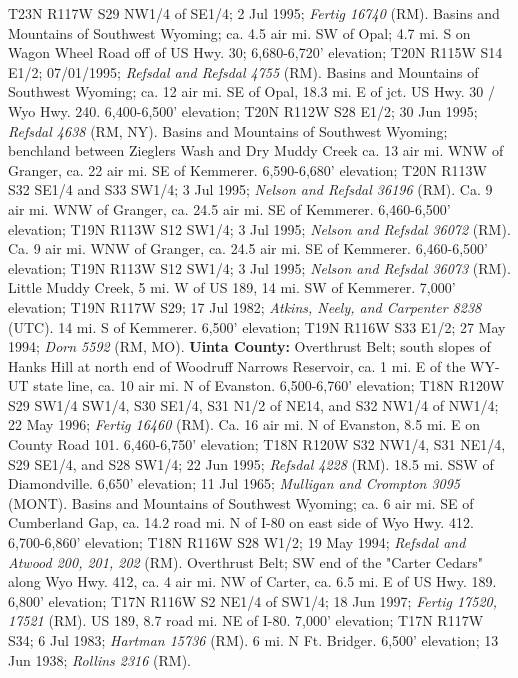 T23N R117W S29 NW1/4 of SE1/4; 2 Jul 1995; \textit{Fertig 16740} (RM).
Basins and Mountains of Southwest Wyoming; ca. 4.5 air mi. SW of Opal; 4.7 mi. S
on Wagon Wheel Road off of US Hwy. 30; 6,680-6,720' elevation;
T20N R115W S14 E1/2; 07/01/1995; \textit{Refsdal and Refsdal 4755} (RM).
Basins and Mountains of Southwest Wyoming; ca. 12 air mi. SE of Opal, 18.3 mi. E
of jct. US Hwy. 30 / Wyo Hwy. 240. 6,400-6,500' elevation; T20N R112W S28 E1/2;
30 Jun 1995; \textit{Refsdal 4638} (RM, NY).
Basins and Mountains of Southwest Wyoming; benchland between Zieglers Wash and
Dry Muddy Creek ca. 13 air mi. WNW of Granger, ca. 22 air mi. SE of Kemmerer.
6,590-6,680' elevation; T20N R113W S32 SE1/4 and S33 SW1/4; 3 Jul 1995;
\textit{Nelson and Refsdal 36196} (RM).
Ca. 9 air mi. WNW of Granger, ca. 24.5 air mi. SE of Kemmerer.
6,460-6,500' elevation; T19N R113W S12 SW1/4; 3 Jul 1995;
\textit{Nelson and Refsdal 36072} (RM).
Ca. 9 air mi. WNW of Granger, ca. 24.5 air mi. SE of Kemmerer.
6,460-6,500' elevation; T19N R113W S12 SW1/4; 3 Jul 1995;
\textit{Nelson and Refsdal 36073} (RM).
Little Muddy Creek, 5 mi. W of US 189, 14 mi. SW of Kemmerer. 7,000' elevation;
T19N R117W S29; 17 Jul 1982; \textit{Atkins, Neely, and Carpenter 8238} (UTC).
14 mi. S of Kemmerer. 6,500' elevation; T19N R116W S33 E1/2; 27 May 1994;
\textit{Dorn 5592} (RM, MO).
  \textbf{Uinta County:}
Overthrust Belt; south slopes of Hanks Hill at north end of Woodruff Narrows
Reservoir, ca. 1 mi. E of the WY-UT state line, ca. 10 air mi. N of Evanston.
6,500-6,760' elevation; T18N R120W S29 SW1/4 SW1/4, S30 SE1/4, S31 N1/2 of NE14,
and S32 NW1/4 of NW1/4; 22 May 1996; \textit{Fertig 16460} (RM).
Ca. 16 air mi. N of Evanston, 8.5 mi. E on County Road 101.
6,460-6,750' elevation; T18N R120W S32 NW1/4, S31 NE1/4, S29 SE1/4, and
S28 SW1/4; 22 Jun 1995; \textit{Refsdal 4228} (RM).
18.5 mi. SSW of Diamondville. 6,650’ elevation; 11 Jul 1965;
\textit{Mulligan and Crompton 3095} (MONT).
Basins and Mountains of Southwest Wyoming; ca. 6 air mi. SE of Cumberland Gap,
ca. 14.2 road mi. N of I-80 on east side of Wyo Hwy. 412.
6,700-6,860' elevation; T18N R116W S28 W1/2; 19 May 1994;
\textit{Refsdal and Atwood 200, 201, 202} (RM).
Overthrust Belt; SW end of the "Carter Cedars" along Wyo Hwy. 412,
ca. 4 air mi. NW of Carter, ca. 6.5 mi. E of US Hwy. 189. 6,800' elevation;
T17N R116W S2 NE1/4 of SW1/4; 18 Jun 1997; \textit{Fertig 17520, 17521} (RM).
US 189, 8.7 road mi. NE of I-80. 7,000' elevation; T17N R117W S34; 6 Jul 1983;
\textit{Hartman 15736} (RM).
6 mi. N Ft. Bridger. 6,500' elevation; 13 Jun 1938; \textit{Rollins 2316} (RM).
